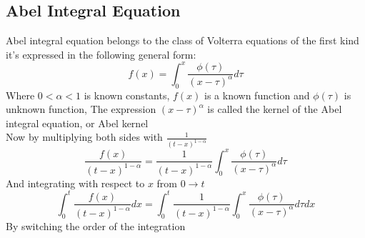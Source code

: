 \documentclass[]{article}
\begin{document}
\subsection{Abel Integral Equation}
Abel integral equation belongs to the class of Volterra equations of the first kind
it's expressed in the following general form:
\[
f(x) = \int_{0}^{x} \frac{\phi(\tau)}{{(x-\tau )}^\alpha} d\tau
\]
Where $0<\alpha<1$ is known constants, $f(x)$ is a known function and $\phi(\tau)$ is unknown function,
The expression ${(x-\tau )}^\alpha$  is called the kernel of the Abel integral equation, or Abel kernel
\\
Now by multiplying both sides with $\displaystyle \frac{1}{{(t-x)}^{1-\alpha}}$
\[
\frac{f(x)}{{(t-x)}^{1-\alpha}} = \frac{1}{{(t-x)}^{1-\alpha}} \int_{0}^{x} \frac{\phi(\tau)}{{(x-\tau)}^\alpha} d\tau
\]
And integrating with respect to $x$ from $0 \to t$
\[
\int_{0}^{t} \frac{f(x)}{{(t-x)}^{1-\alpha}} dx=  \int_{0}^{t} \frac{1}{{(t-x)}^{1-\alpha}} \int_{0}^{x} \frac{\phi(\tau)}{{(x-\tau)}^\alpha} d\tau dx
\]
By switching the order of the integration 
\end{document}
